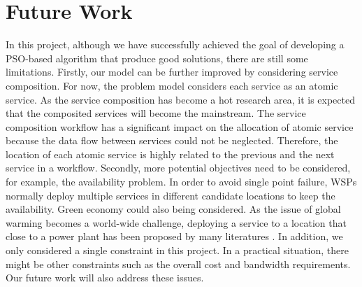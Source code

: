 \section{Future Work}
In this project, although we have successfully achieved the goal of developing a PSO-based algorithm that produce good solutions, 
there are still some limitations. Firstly, our model can be further improved by considering service composition. 
For now, the problem model considers each service as an atomic service. 
As the service composition has become a hot research area, it is expected that the composited services will become the mainstream.
The service composition workflow has a significant impact on the allocation of atomic service because the data flow between
services could not be neglected. Therefore, the location of each atomic service is highly related to the previous and the next service in a workflow.
Secondly, more potential objectives need to be considered, for example, the availability problem. In order to avoid single point failure, 
WSPs normally deploy multiple services in different candidate locations to keep the availability. Green economy could also being considered. As the issue
of global warming becomes a world-wide challenge, deploying a service to a location that close to a power plant has been proposed by many literatures \cite{Schien}.
In addition, we only considered a single constraint in this project. In a practical situation, there might be other constraints such as the overall cost and bandwidth requirements. 
Our future work will also address these issues.



